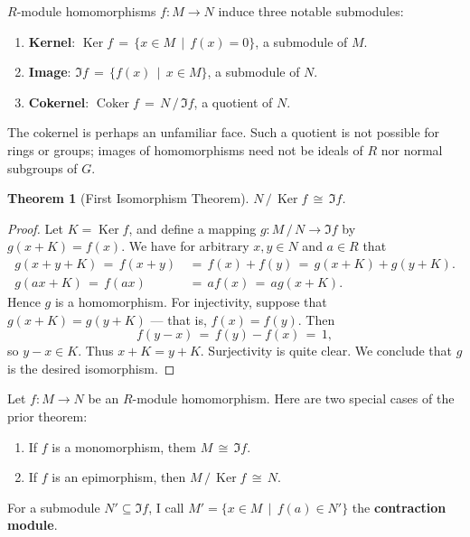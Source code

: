 \documentclass[11pt]{article}
\newtheorem{theorem}{Theorem}
\newcommand{\Ker}{\operatorname{Ker}}
\newcommand{\Coker}{\operatorname{Coker}}
\begin{document}
$R$-module homomorphisms $f : M \to N$ induce three notable submodules: 
\begin{enumerate}
  \item \textbf{Kernel}: $\Ker f \, = \, \{ x \in M \, \mid \, f(x) = 0 \}$, a submodule of $M$.
  \item \textbf{Image}: $\Im f \, = \, \{ f(x) \, \mid \, x \in M \}$, a submodule of $N$.
  \item \textbf{Cokernel}: $\Coker f \, = \, N \, / \, \Im f$, a quotient of $N$.
\end{enumerate}
The cokernel is perhaps an unfamiliar face. Such a quotient is not possible for rings or groups; images of homomorphisms need not be ideals of $R$ nor normal subgroups of $G$. 

\begin{adjustwidth}{0.5cm}{}
  \begin{theorem}[First Isomorphism Theorem]
     $N \, / \, \Ker f \, \cong \, \Im f$.
  \end{theorem}
  \begin{proof}
    Let $K = \Ker f$, and define a mapping $g : M \, / \, N \to \Im f$ by $g(x + K) = f(x)$. We have for arbitrary $x, y \in N$ and $a \in R$ that
    \begin{align*}
      g(x + y + K) \, = \, f(x + y) \, &= \, f(x) + f(y) \, = \, g(x + K) + g(y + K). \\
            g(ax + K) \, = \, f(ax) \, &= \, a f(x) \, = \, a g(x + K).
    \end{align*}
    Hence $g$ is a homomorphism. For injectivity, suppose that $g(x + K) = g(y + K)$ --- that is, $f(x) = f(y)$. Then
    \[
      f(y - x) \, = \, f(y) - f(x) \, = \, 1,
    \]
    so $y - x \in K$. Thus $x + K = y + K$. Surjectivity is quite clear. We conclude that $g$ is the desired isomorphism.
  \end{proof}
\end{adjustwidth}

Let $f : M \to N$ be an $R$-module homomorphism. Here are two special cases of the prior theorem:
\begin{enumerate}
  \item If $f$ is a monomorphism, them $M \, \cong \, \Im f$.
  \item If $f$ is an epimorphism, then $M \, / \, \Ker f \, \cong \, N$.
\end{enumerate}

For a submodule $N' \subseteq \Im f$, I call $M' = \{ x \in M \, \mid \, f(a) \in N' \}$ the \textbf{contraction module}.
\end{document}
